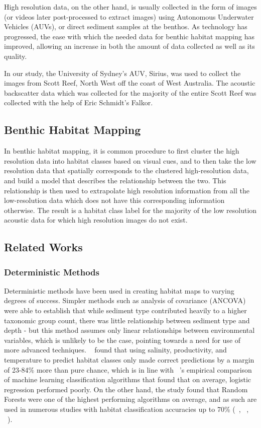 \documentclass[journal]{IEEEtran}
\begin{document}
    High resolution data, on the other hand, is usually collected in the form of images (or videos later post-processed to extract images) using Autonomous Underwater Vehicles (AUVs), or direct sediment samples at the benthos. As technology has progressed, the ease with which the needed data for benthic habitat mapping has improved, allowing an increase in both the amount of data collected as well as its quality. 
    
    In our study, the University of Sydney's AUV, Sirius, was used to collect the images from Scott Reef, North West off the coast of West Australia. The acoustic backscatter data which was collected for the majority of the entire Scott Reef was collected with the help of Eric Schmidt's Falkor.

    \subsection{Benthic Habitat Mapping}

    In benthic habitat mapping, it is common procedure to first cluster the high resolution data into habitat classes based on visual cues, and to then take the low resolution data that spatially corresponds to the clustered high-resolution data, and build a model that describes the relationship between the two. This relationship is then used to extrapolate high resolution information from all the low-resolution data which does not have this corresponding information otherwise. The result is a habitat class label for the majority of the low resolution acoustic data for which high resolution images do not exist. 

    \subsection{Related Works}

    \subsubsection{Deterministic Methods}

    Deterministic methods have been used in creating habitat maps to varying degrees of success. Simpler methods such as analysis of covariance (ANCOVA) were able to establish that while sediment type contributed heavily to a higher taxonomic group count, there was little relationship between sediment type and depth - but this method assumes only linear relationships between environmental variables, which is unlikely to be the case, pointing towards a need for use of more advanced techniques. ~\citet{belanger12} found that using salinity, productivity, and temperature to predict habitat classes only made correct predictions by a margin of 23-84\% more than pure chance, which is in line with ~\citet{caruana06}'s empirical comparison of machine learning classification algorithms that found that on average, logistic regression performed poorly. On the other hand, the study found that Random Forests were one of the highest performing algorithms on average, and as such are used in numerous studies with habitat classification accuracies up to 70\% (~\citet{lucieer13}, ~\citet{seiler12}, ~\citet{hasan14}).
    
\end{document}
